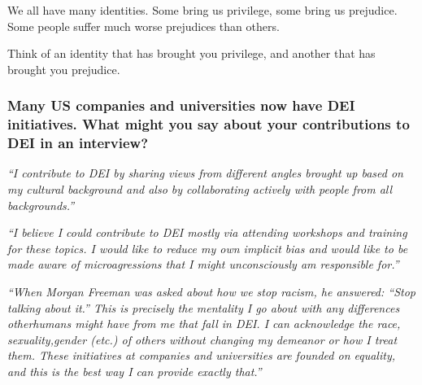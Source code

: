 \documentclass[12pt]{beamer}
\newcommand\ans[1]{{\it ``#1''}}
\newcommand\gap{\vspace{5mm}}
\begin{document}
\begin{frame}

  We all have many identities. Some bring us privilege, some bring us prejudice. Some people suffer much worse prejudices than others.

  \gap
  
  Think of an identity that has brought you privilege, and another that has brought you prejudice.
  
  \end{frame}

\begin{frame} %

  \frametitle{Many US companies and universities now have DEI initiatives. What might you say about your contributions to DEI in an interview?}

  \ans{I contribute to DEI by sharing views from different angles brought up based on my cultural background and also by collaborating actively with people from all backgrounds.}

  \gap
  
  \ans{I  believe  I  could  contribute  to  DEI  mostly  via  attending  workshops  and  training  for these  topics.   I  would  like  to  reduce  my  own  implicit  bias  and  would  like  to  be  made aware of microagressions that I might unconsciously am responsible for.}
\end{frame}

\begin{frame}
  \ans{When  Morgan  Freeman  was  asked  about  how  we  stop  racism,  he  answered:  ``Stop talking about it.'' This is precisely the mentality I go about with any differences otherhumans might have from me that fall in DEI. I can acknowledge the race, sexuality,gender (etc.)  of others without changing my demeanor or how I treat them.  These initiatives at companies and universities are founded on equality, and this is the best way I can provide exactly that.}

\end{frame}
\end{document}
